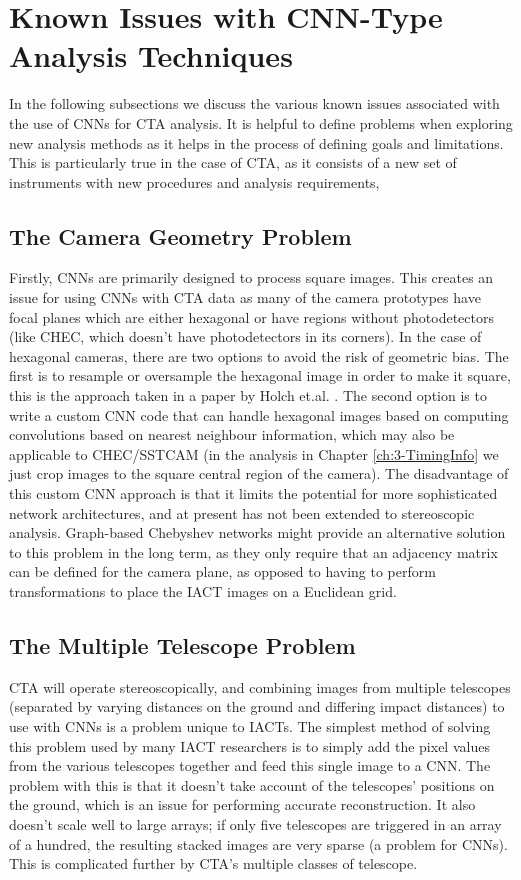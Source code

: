 \section{Known Issues with CNN-Type Analysis Techniques}
In the following subsections we discuss the various known issues associated with the use of CNNs for CTA analysis. It is helpful to define problems when exploring new analysis methods as it helps in the process of defining goals and limitations. This is particularly true in the case of CTA, as it consists of a new set of instruments with new procedures and analysis requirements,

\subsection{The Camera Geometry Problem}

Firstly, CNNs are primarily designed to process square images. This creates an issue for using CNNs with CTA data as many of the camera prototypes have focal planes which are either hexagonal or have regions without photodetectors (like CHEC, which doesn't have photodetectors in its corners). In the case of hexagonal cameras, there are two options to avoid the risk of geometric bias. The first is to resample or oversample the hexagonal image in order to make it square, this is the approach taken in a paper by Holch et.al. \cite{Hexagdly}. The second option is to write a custom CNN code that can handle hexagonal images based on computing convolutions based on nearest neighbour information, which may also be applicable to CHEC/SSTCAM (in the analysis in Chapter \ref{ch:3-TimingInfo} we just crop images to the square central region of the camera). The disadvantage of this custom CNN approach is that it limits the potential for more sophisticated network architectures, and at present has not been extended to stereoscopic analysis. Graph-based Chebyshev networks \cite{adithesis} might provide an alternative solution to this problem in the long term, as they only require that an adjacency matrix can be defined for the camera plane, as opposed to having to perform transformations to place the IACT images on a Euclidean grid. 

\subsection{The Multiple Telescope Problem}

CTA will operate stereoscopically, and combining images from multiple telescopes (separated by varying distances on the ground and differing impact distances) to use with CNNs is a problem unique to IACTs. The simplest method of solving this problem used by many IACT researchers is to simply add the pixel values from the various telescopes together and feed this single image to a CNN. The problem with this is that it doesn't take account of the telescopes' positions on the ground, which is an issue for performing accurate reconstruction. It also doesn't scale well to large arrays; if only five telescopes are triggered in an array of a hundred, the resulting stacked images are very sparse (a problem for CNNs). This is complicated further by CTA's multiple classes of telescope.

